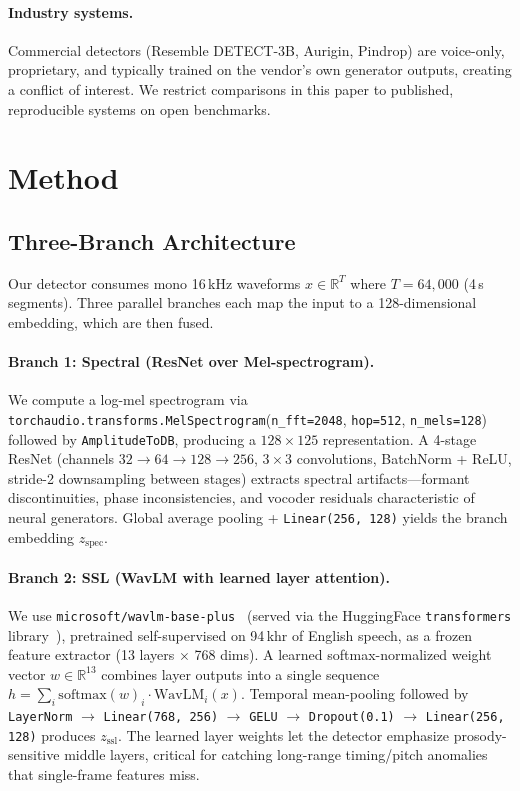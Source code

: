 \documentclass[10pt,twocolumn,a4paper]{article}
\begin{document}
\paragraph{Industry systems.}
Commercial detectors (Resemble DETECT-3B, Aurigin, Pindrop) are voice-only, proprietary, and typically trained on the vendor's own generator outputs, creating a conflict of interest. We restrict comparisons in this paper to published, reproducible systems on open benchmarks.

\section{Method}
\label{sec:method}

\subsection{Three-Branch Architecture}
\label{sec:branches}

Our detector consumes mono 16\,kHz waveforms $x \in \mathbb{R}^{T}$ where $T=64{,}000$ (4\,s segments). Three parallel branches each map the input to a 128-dimensional embedding, which are then fused.

\paragraph{Branch 1: Spectral (ResNet over Mel-spectrogram).}
We compute a log-mel spectrogram via \texttt{torchaudio.transforms.MelSpectrogram}\allowbreak(\texttt{n\_fft=2048}, \texttt{hop=512}, \texttt{n\_mels=128}) followed by \texttt{AmplitudeToDB}, producing a $128\times 125$ representation. A 4-stage ResNet (channels $32 \to 64 \to 128 \to 256$, $3\times3$ convolutions, BatchNorm + ReLU, stride-2 downsampling between stages) extracts spectral artifacts---formant discontinuities, phase inconsistencies, and vocoder residuals characteristic of neural generators. Global average pooling + \texttt{Linear(256, 128)} yields the branch embedding $z_{\text{spec}}$.

\paragraph{Branch 2: SSL (WavLM with learned layer attention).}
We use \texttt{microsoft/wavlm-base-plus}~\cite{wavlm} (served via the HuggingFace \texttt{transformers} library~\cite{huggingface_transformers}), pretrained self-supervised on 94\,khr of English speech, as a frozen feature extractor (13 layers $\times$ 768 dims). A learned softmax-normalized weight vector $w \in \mathbb{R}^{13}$ combines layer outputs into a single sequence $h = \sum_i \text{softmax}(w)_i \cdot \text{WavLM}_i(x)$. Temporal mean-pooling followed by \texttt{LayerNorm} $\to$ \texttt{Linear(768, 256)} $\to$ \texttt{GELU} $\to$ \texttt{Dropout(0.1)} $\to$ \texttt{Linear(256, 128)} produces $z_{\text{ssl}}$. The learned layer weights let the detector emphasize prosody-sensitive middle layers, critical for catching long-range timing/pitch anomalies that single-frame features miss.
\end{document}
